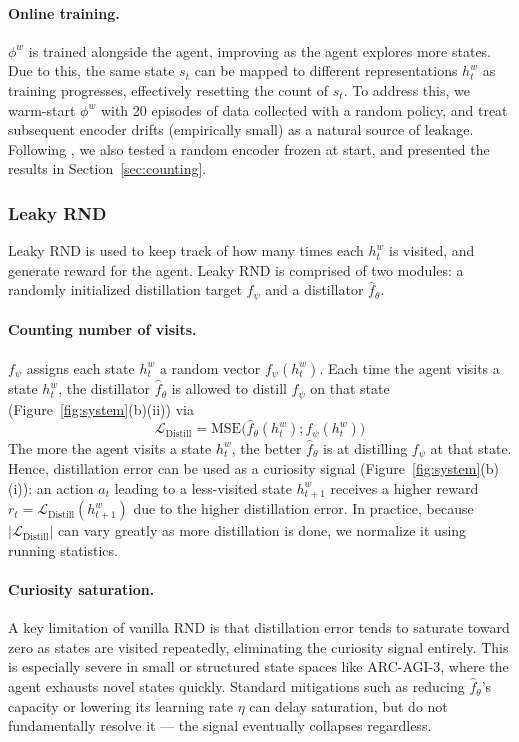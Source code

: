 \documentclass{article}
\begin{document}
\paragraph{Online training.} $\phi^w$ is trained alongside the agent, improving as the agent explores more states. Due to this, the same state $s_t$ can be mapped to different representations $h_t^w$ as training progresses, effectively resetting the count of $s_t$. To address this, we warm-start $\phi^w$ with 20 episodes of data collected with a random policy, and treat subsequent encoder drifts (empirically small) as a natural source of leakage. Following \citet{burda_large-scale_2018}, we also tested a random encoder frozen at start, and presented the results in Section~\ref{sec:counting}.

\subsubsection{Leaky RND}
Leaky RND is used to keep track of how many times each $h_t^w$ is visited, and generate reward for the agent. Leaky RND is comprised of two modules: a randomly initialized distillation target $f_\psi$ and a distillator $\hat{f}_\theta$.

\paragraph{Counting number of visits.} $f_\psi$ assigns each state $h_t^w$ a random vector $f_\psi(h_t^w)$. Each time the agent visits a state $h_t^w$, the distillator $\hat{f}_\theta$ is allowed to distill $f_\psi$ on that state (Figure~\ref{fig:system}(b)(ii)) via
\begin{equation}
\mathcal{L}_{\text{Distill}} = \text{MSE}\big(\hat{f}_{\theta}(h_{t}^w); f_{\psi}(h_{t}^w)\big)
\label{eq:distill}
\end{equation}
The more the agent visits a state $h_t^w$, the better $\hat{f}_{\theta}$ is at distilling $f_{\psi}$ at that state. Hence, distillation error can be used as a curiosity signal (Figure~\ref{fig:system}(b)(i)): an action $a_t$ leading to a less-visited state $h_{t+1}^w$ receives a higher reward $r_t = \mathcal{L}_{\text{Distill}}(h_{t+1}^w)$ due to the higher distillation error. In practice, because $|\mathcal{L}_{\text{Distill}}|$ can vary greatly as more distillation is done, we normalize it using running statistics.

\paragraph{Curiosity saturation.} A key limitation of vanilla RND is that distillation error tends to saturate toward zero as states are visited repeatedly, eliminating the curiosity signal entirely. This is especially severe in small or structured state spaces like ARC-AGI-3, where the agent exhausts novel states quickly. Standard mitigations such as reducing $\hat{f}_\theta$'s capacity or lowering its learning rate $\eta$ can delay saturation, but do not fundamentally resolve it --- the signal eventually collapses regardless.
\end{document}
